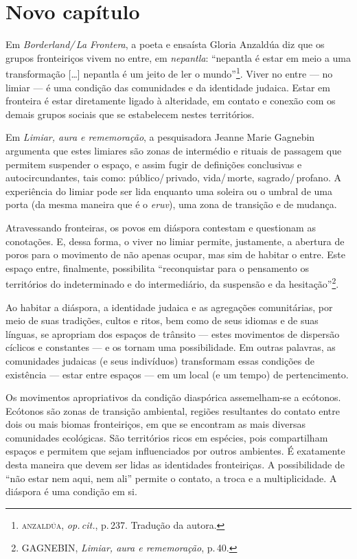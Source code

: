 \chapter{Novo capítulo}

\noindent{}Em \emph{Borderland/\,La Frontera}, a poeta e ensaísta Gloria Anzaldúa diz
que os grupos fronteiriços vivem no entre, em \emph{nepantla}:
``nepantla é estar em meio a uma transformação {[}\ldots{}{]} nepantla
é um jeito de ler o mundo''\footnote{\textsc{anzaldúa}, \emph{op.\,cit.}, p.\,237. Tradução da autora.}. Viver no entre --- no limiar --- é uma condição das
comunidades e da identidade judaica. Estar em fronteira é estar
diretamente ligado à alteridade, em contato e conexão com os demais
grupos sociais que se estabelecem nestes territórios.

Em \emph{Limiar, aura e rememoração}, a pesquisadora Jeanne Marie
Gagnebin argumenta que estes limiares são zonas de intermédio e rituais
de passagem que permitem suspender o espaço, e assim fugir de definições
conclusivas e autocircundantes, tais como: público/\,privado, vida/\,morte,
sagrado/\,profano. A experiência do limiar pode ser lida enquanto uma
soleira ou o umbral de uma porta (da mesma maneira que é o \emph{eruv}),
uma zona de transição e de mudança.

Atravessando fronteiras, os povos em diáspora contestam e questionam as
conotações. E, dessa forma, o viver no limiar permite, justamente, a
abertura de poros para o movimento de não apenas ocupar, mas sim de
habitar o entre. Este espaço entre, finalmente, possibilita
``reconquistar para o pensamento os territórios do indeterminado e
do intermediário, da suspensão e da hesitação''\footnote{GAGNEBIN,
  \emph{Limiar, aura e rememoração}, p.\,40.}.

Ao habitar a diáspora, a identidade judaica e as agregações
comunitárias, por meio de suas tradições, cultos e ritos, bem como de
seus idiomas e de suas línguas, se apropriam dos espaços de trânsito ---
estes movimentos de dispersão cíclicos e constantes --- e os tornam uma
possibilidade. Em outras palavras, as comunidades judaicas (e seus
indivíduos) transformam essas condições de existência --- estar entre
espaços --- em um local (e um tempo) de pertencimento.

Os movimentos apropriativos da condição diaspórica assemelham-se a
ecótonos. Ecótonos são zonas de transição ambiental, regiões resultantes
do contato entre dois ou mais biomas fronteiriços, em que se encontram
as mais diversas comunidades ecológicas. São territórios ricos em
espécies, pois compartilham espaços e permitem que sejam influenciados
por outros ambientes. É exatamente desta maneira que devem ser lidas as
identidades fronteiriças. A possibilidade de ``não estar nem aqui, nem
ali'' permite o contato, a troca e a multiplicidade. A diáspora é uma
condição em si.

